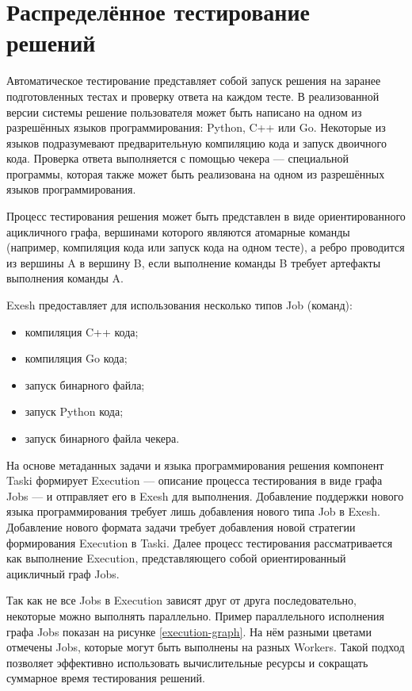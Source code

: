 \section{Распределённое тестирование решений}

Автоматическое тестирование представляет собой запуск решения на заранее подготовленных тестах и проверку ответа на каждом тесте.
В реализованной версии системы решение пользователя может быть написано на одном из разрешённых языков программирования: Python, C++ или Go.
Некоторые из языков подразумевают предварительную компиляцию кода и запуск двоичного кода.
Проверка ответа выполняется с помощью чекера --- специальной программы,
которая также может быть реализована на одном из разрешённых языков программирования.

Процесс тестирования решения может быть представлен в виде ориентированного ацикличного графа,
вершинами которого являются атомарные команды (например, компиляция кода или запуск кода на одном тесте),
а ребро проводится из вершины A в вершину B, если выполнение команды B требует артефакты выполнения команды A.

Exesh предоставляет для использования несколько типов Job (команд):
\begin{itemize}
\item компиляция C++ кода;
\item компиляция Go кода;
\item запуск бинарного файла;
\item запуск Python кода;
\item запуск бинарного файла чекера.
\end{itemize}

На основе метаданных задачи и языка программирования решения компонент Taski формирует Execution ---
описание процесса тестирования в виде графа Jobs --- и отправляет его в Exesh для выполнения.
Добавление поддержки нового языка программирования требует лишь добавления нового типа Job в Exesh.
Добавление нового формата задачи требует добавления новой стратегии формирования Execution в Taski.
Далее процесс тестирования рассматривается как выполнение Execution, представляющего собой ориентированный ацикличный граф Jobs.

Так как не все Jobs в Execution зависят друг от друга последовательно, некоторые можно выполнять параллельно.
Пример параллельного исполнения графа Jobs показан на рисунке \ref{execution-graph}.
На нём разными цветами отмечены Jobs, которые могут быть выполнены на разных Workers.
Такой подход позволяет эффективно использовать вычислительные ресурсы и сокращать суммарное время тестирования решений.

